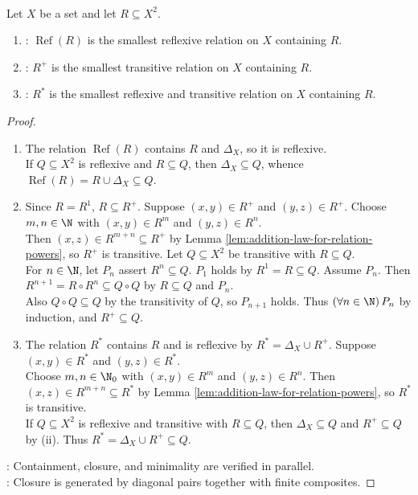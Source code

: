 \begin{theorem} \label{thm:reflexive-and-transitive-closures-are-smallest} \\
Let $X$ be a set and let $R\subseteq X^2$.
\begin{enumerate}[label=(\roman*)]
\setlength{\itemsep}{0pt}
\item {}: $\operatorname{Ref}(R)$ is the smallest reflexive relation on $X$ containing $R$.
\item {}: $R^+$ is the smallest transitive relation on $X$ containing $R$.
\item {}: $R^*$ is the smallest reflexive and transitive relation on $X$ containing $R$.
\end{enumerate}
\begin{proof}
\begin{enumerate}[label=(\roman*)]
\setlength{\itemsep}{0pt}
\item The relation $\operatorname{Ref}(R)$ contains $R$ and $\Delta_X$, so it is reflexive.\\
If $Q\subseteq X^2$ is reflexive and $R\subseteq Q$, then $\Delta_X\subseteq Q$, whence $\operatorname{Ref}(R)=R\cup\Delta_X\subseteq Q$.
\item Since $R=R^1$, $R\subseteq R^+$. Suppose $(x,y)\in R^+$ and $(y,z)\in R^+$. Choose $m,n\in\N$ with $(x,y)\in R^m$ and $(y,z)\in R^n$.\\
Then $(x,z)\in R^{m+n}\subseteq R^+$ by Lemma \ref{lem:addition-law-for-relation-powers}, so $R^+$ is transitive. Let $Q\subseteq X^2$ be transitive with $R\subseteq Q$.\\
For $n\in\N$, let $P_n$ assert $R^n\subseteq Q$. $P_1$ holds by $R^1=R\subseteq Q$. Assume $P_n$. Then $R^{n+1}=R\circ R^n\subseteq Q\circ Q$ by $R\subseteq Q$ and $P_n$.\\
Also $Q\circ Q\subseteq Q$ by the transitivity of $Q$, so $P_{n+1}$ holds. Thus $(\forall n\in\N)\,P_n$ by induction, and $R^+\subseteq Q$.
\item The relation $R^*$ contains $R$ and is reflexive by $R^*=\Delta_X\cup R^+$. Suppose $(x,y)\in R^*$ and $(y,z)\in R^*$.\\
Choose $m,n\in\N_0$ with $(x,y)\in R^m$ and $(y,z)\in R^n$. Then $(x,z)\in R^{m+n}\subseteq R^*$ by Lemma \ref{lem:addition-law-for-relation-powers}, so $R^*$ is transitive.\\
If $Q\subseteq X^2$ is reflexive and transitive with $R\subseteq Q$, then $\Delta_X\subseteq Q$ and $R^+\subseteq Q$ by (ii). Thus $R^*=\Delta_X\cup R^+\subseteq Q$.
\end{enumerate}
: Containment, closure, and minimality are verified in parallel.\\
: Closure is generated by diagonal pairs together with finite composites.
\end{proof}
\end{theorem}

